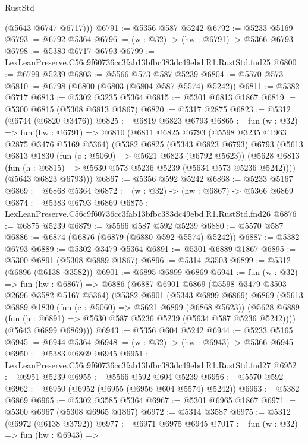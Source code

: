 \begin{lexlean}{RustStd}
\begin{coremodule}
        (@5643 @6747 @6717)))
@6791 := @5356 @587 @5242
@6792 := @5233 @5169
@6793 := @6792 @5364
@6796 := (w : @32) -> (hw : @6791) -> @5366 @6793
@6798 := @5383 @6717 @6793
@6799 := LexLeanPreserve.C56c9f60736cc3fab13bfbc383dc49ebd.R1.RustStd.fnd25
@6800 := @6799 @5239
@6803 := @5566 @573 @587 @5239
@6804 := @5570 @573
@6810 := @6798 (@6800 (@6803 (@6804 @587 @5574) @5242))
@6811 := @5382 @6717
@6813 := @5302 @3235 @5364
@6815 := @5301 @6813 @1867
@6819 := @5300 @6815 (@5308 @6813 @1867)
@6820 := @5317 @2875
@6823 := @5312 (@6744 (@6820 @3476))
@6825 := @6819 @6823 @6793
@6865 := fun (w : @32) =>
  fun (hw : @6791) =>
  @6810
    (@6811
      @6825
      @6793
      (@5598 @3235 @1963 @2875 @3476 @5169 @5364)
      (@5382
        @6825
        (@5343 @6823 @6793)
        @6793
        (@5613
          @6813
          @1830
          (fun (c : @5060) => @5621 @6823 (@6792 @5623))
          (@5628 @6813 (fun (h : @6815) => @5630 @573 @5236 @5239 (@5634 @573 @5236 @5242))))
        (@5643 @6823 @6793)))
@6867 := @5356 @592 @5242
@6868 := @5233 @5167
@6869 := @6868 @5364
@6872 := (w : @32) -> (hw : @6867) -> @5366 @6869
@6874 := @5383 @6793 @6869
@6875 := LexLeanPreserve.C56c9f60736cc3fab13bfbc383dc49ebd.R1.RustStd.fnd26
@6876 := @6875 @5239
@6879 := @5566 @587 @592 @5239
@6880 := @5570 @587
@6886 := @6874 (@6876 (@6879 (@6880 @592 @5574) @5242))
@6887 := @5382 @6793
@6889 := @5302 @3479 @5364
@6891 := @5301 @6889 @1867
@6895 := @5300 @6891 (@5308 @6889 @1867)
@6896 := @5314 @3503
@6899 := @5312 (@6896 (@6138 @3582))
@6901 := @6895 @6899 @6869
@6941 := fun (w : @32) =>
  fun (hw : @6867) =>
  @6886
    (@6887
      @6901
      @6869
      (@5598 @3479 @3503 @2696 @3582 @5167 @5364)
      (@5382
        @6901
        (@5343 @6899 @6869)
        @6869
        (@5613
          @6889
          @1830
          (fun (c : @5060) => @5621 @6899 (@6868 @5623))
          (@5628 @6889 (fun (h : @6891) => @5630 @587 @5236 @5239 (@5634 @587 @5236 @5242))))
        (@5643 @6899 @6869)))
@6943 := @5356 @604 @5242
@6944 := @5233 @5165
@6945 := @6944 @5364
@6948 := (w : @32) -> (hw : @6943) -> @5366 @6945
@6950 := @5383 @6869 @6945
@6951 := LexLeanPreserve.C56c9f60736cc3fab13bfbc383dc49ebd.R1.RustStd.fnd27
@6952 := @6951 @5239
@6955 := @5566 @592 @604 @5239
@6956 := @5570 @592
@6962 := @6950 (@6952 (@6955 (@6956 @604 @5574) @5242))
@6963 := @5382 @6869
@6965 := @5302 @3585 @5364
@6967 := @5301 @6965 @1867
@6971 := @5300 @6967 (@5308 @6965 @1867)
@6972 := @5314 @3587
@6975 := @5312 (@6972 (@6138 @3792))
@6977 := @6971 @6975 @6945
@7017 := fun (w : @32) =>
  fun (hw : @6943) =>

\end{coremodule}
\end{lexlean}
